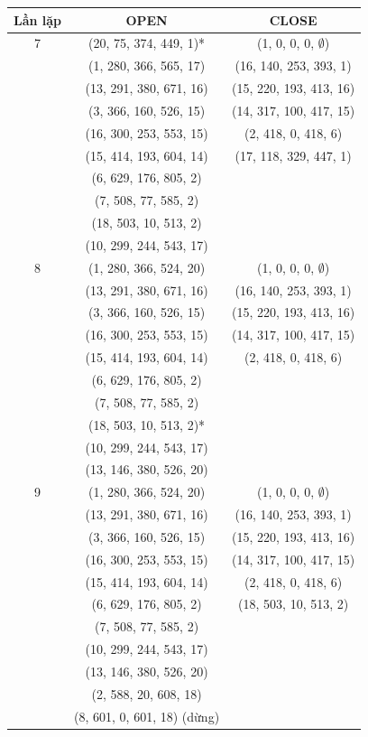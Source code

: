 \documentclass[a4paper, 11pt]{article}
\begin{document}
\begin{center}
  \begin{tabular}{ |c|c|c| }
    \hline
    Lần lặp & OPEN & CLOSE \\
    \hline
      7 & (20, 75, 374, 449, 1)* & (1, 0, 0, 0, $\emptyset$)\\
      & (1, 280, 366, 565, 17) & (16, 140, 253, 393, 1)\\
      & (13, 291, 380, 671, 16) & (15, 220, 193, 413, 16)\\
      & (3, 366, 160, 526, 15) & (14, 317, 100, 417, 15)\\
      & (16, 300, 253, 553, 15) & (2, 418, 0, 418, 6)\\
      & (15, 414, 193, 604, 14) & (17, 118, 329, 447, 1)\\
      & (6, 629, 176, 805, 2) & \\
      & (7, 508, 77, 585, 2) & \\
      & (18, 503, 10, 513, 2) & \\
      & (10, 299, 244, 543, 17) & \\
    \hline
      8 & (1, 280, 366, 524, 20) & (1, 0, 0, 0, $\emptyset$)\\
      & (13, 291, 380, 671, 16) & (16, 140, 253, 393, 1)\\
      & (3, 366, 160, 526, 15) & (15, 220, 193, 413, 16)\\
      & (16, 300, 253, 553, 15) & (14, 317, 100, 417, 15)\\
      & (15, 414, 193, 604, 14) & (2, 418, 0, 418, 6)\\
      & (6, 629, 176, 805, 2) & \\
      & (7, 508, 77, 585, 2) & \\
      & (18, 503, 10, 513, 2)* & \\
      & (10, 299, 244, 543, 17) & \\
      & (13, 146, 380, 526, 20)& \\
    \hline
      9 & (1, 280, 366, 524, 20) & (1, 0, 0, 0, $\emptyset$)\\
      & (13, 291, 380, 671, 16) & (16, 140, 253, 393, 1)\\
      & (3, 366, 160, 526, 15) & (15, 220, 193, 413, 16)\\
      & (16, 300, 253, 553, 15) & (14, 317, 100, 417, 15)\\
      & (15, 414, 193, 604, 14) & (2, 418, 0, 418, 6)\\
      & (6, 629, 176, 805, 2) & (18, 503, 10, 513, 2)\\
      & (7, 508, 77, 585, 2) & \\
      & (10, 299, 244, 543, 17) & \\
      & (13, 146, 380, 526, 20) & \\
      & (2, 588, 20, 608, 18) & \\
      & (8, 601, 0, 601, 18) (dừng) & \\
    \hline
  \end{tabular}
\end{center}
\end{document}
